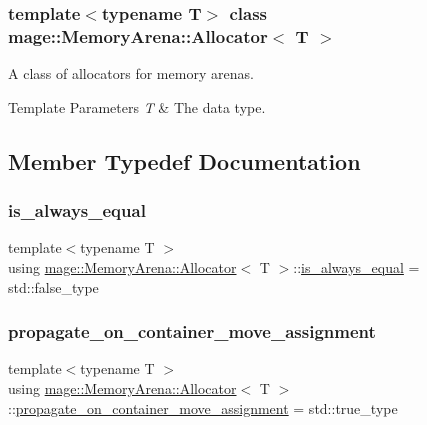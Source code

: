 \subsubsection*{template$<$typename T$>$\newline
class mage\+::\+Memory\+Arena\+::\+Allocator$<$ T $>$}

A class of allocators for memory arenas.


\begin{DoxyTemplParams}{Template Parameters}
{\em T} & The data type. \\
\hline
\end{DoxyTemplParams}


\subsection{Member Typedef Documentation}
\mbox{\label{classmage_1_1_memory_arena_1_1_allocator_a5f25626106f2f21d37b75b271f230ae4}} 
\subsubsection{\texorpdfstring{is\+\_\+always\+\_\+equal}{is\_always\_equal}}
{\footnotesize\ttfamily template$<$typename T $>$ \\
using \mbox{\hyperlink{classmage_1_1_memory_arena_1_1_allocator}{mage\+::\+Memory\+Arena\+::\+Allocator}}$<$ T $>$\+::\mbox{\hyperlink{classmage_1_1_memory_arena_1_1_allocator_a5f25626106f2f21d37b75b271f230ae4}{is\+\_\+always\+\_\+equal}} =  std\+::false\+\_\+type}

\mbox{\label{classmage_1_1_memory_arena_1_1_allocator_a00a438b50f33f4c7b68a20c994e6fc4b}} 
\subsubsection{\texorpdfstring{propagate\+\_\+on\+\_\+container\+\_\+move\+\_\+assignment}{propagate\_on\_container\_move\_assignment}}
{\footnotesize\ttfamily template$<$typename T $>$ \\
using \mbox{\hyperlink{classmage_1_1_memory_arena_1_1_allocator}{mage\+::\+Memory\+Arena\+::\+Allocator}}$<$ T $>$\+::\mbox{\hyperlink{classmage_1_1_memory_arena_1_1_allocator_a00a438b50f33f4c7b68a20c994e6fc4b}{propagate\+\_\+on\+\_\+container\+\_\+move\+\_\+assignment}} =  std\+::true\+\_\+type}

